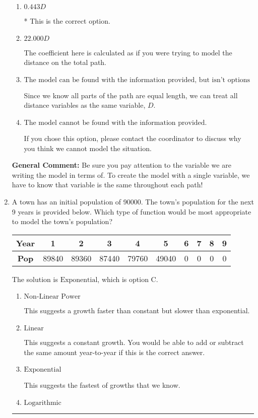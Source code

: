 \documentclass{extbook}[14pt]
\newcommand{\litem}[1]{\item #1

\rule{\textwidth}{0.4pt}}
\begin{document}
\begin{enumerate}
{\begin{enumerate}[label=\Alph*.]
The coefficient here is calculated by multiplying the distances together rather than adding.
\item \( 0.443 D \)

* This is the correct option.
\item \( 22.000 D \)

The coefficient here is calculated as if you were trying to model the distance on the total path.
\item \( \text{The model can be found with the information provided, but isn't options 1-3.} \)

Since we know all parts of the path are equal length, we can treat all distance variables as the same variable, $D$.
\item \( \text{The model cannot be found with the information provided.} \)

If you chose this option, please contact the coordinator to discuss why you think we cannot model the situation.
\end{enumerate}

\textbf{General Comment:} Be sure you pay attention to the variable we are writing the model in terms of. To create the model with a single variable, we have to know that variable is the same throughout each path!
}
\litem{
A town has an initial population of 90000. The town's population for the next 9 years is provided below. Which type of function would be most appropriate to model the town's population?


\begin{tabular}{c|c|c|c|c|c|c|c|c|c}
\textbf{Year} &1 &2 &3 &4 &5 &6 &7 &8 &9\tabularnewline \hline
\textbf{Pop} &89840 &89360 &87440 &79760 &49040 &0 &0 &0 &0\end{tabular}The solution is \( \text{Exponential} \), which is option C.\begin{enumerate}[label=\Alph*.]
\item \( \text{Non-Linear Power} \)

This suggests a growth faster than constant but slower than exponential.
\item \( \text{Linear} \)

This suggests a constant growth. You would be able to add or subtract the same amount year-to-year if this is the correct answer.
\item \( \text{Exponential} \)

This suggests the fastest of growths that we know.
\item \( \text{Logarithmic} \)


\end{enumerate}}
\end{enumerate}
\end{document}
